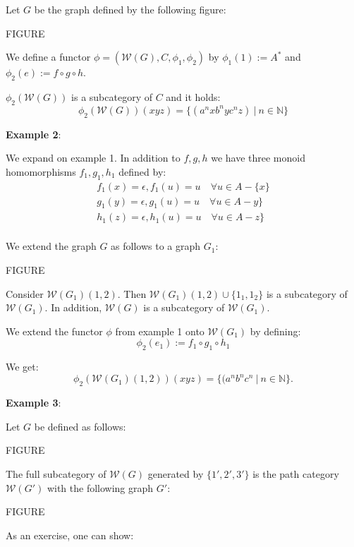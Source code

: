 Let $G$ be the graph defined by the following figure:

FIGURE

We define a functor $\phi = (\mathcal{W}(G), C, \phi_1, \phi_2)$ by $\phi_1(1)
:= A^*$ and $\phi_2(e) := f \circ g \circ h$.

$\phi_2(\mathcal{W}(G))$ is a subcategory of $C$ and it holds:
\[ \phi_2(\mathcal{W}(G))(xyz) = \{ (a^n x b^n y c^n z)\ |\ n \in \mathbb{N} \}
\]

{\bf Example 2}:

We expand on example 1. In addition to $f,g,h$ we have three monoid
homomorphisms $f_1,g_1,h_1$ defined by:
\begin{eqnarray*}
f_1(x) = \epsilon, f_1(u) = u \quad\forall u \in A - \{x\} \\
g_1(y) = \epsilon, g_1(u) = u \quad\forall u \in A - y\} \\
h_1(z) = \epsilon, h_1(u) = u \quad\forall u \in A - z\} \\
\end{eqnarray*}

We extend the graph $G$ as follows to a graph $G_1$:

FIGURE

Consider $\mathcal{W}(G_1)(1,2)$. Then $\mathcal{W}(G_1)(1,2) \cup \{1_1,
1_2\}$ is a subcategory of $\mathcal{W}(G_1)$. In addition, $\mathcal{W}(G)$ is
a subcategory of $\mathcal{W}(G_1)$. 

We extend the functor $\phi$ from example 1
onto $\mathcal{W}(G_1)$ by defining:
\[ \phi_2(e_1) := f_1 \circ g_1 \circ h_1 \]

We get:
\[ \phi_2(\mathcal{W}(G_1)(1,2))(xyz) = \{ (a^n b^n c^n\ |\ n \in \mathbb{N} \}.
\]

{\bf Example 3}:

Let $G$ be defined as follows:

FIGURE

The full subcategory of $\mathcal{W}(G)$ generated by $\{ 1', 2', 3' \}$ is the
path category $\mathcal{W}(G')$ with the following graph $G'$:

FIGURE

As an exercise, one can show:































